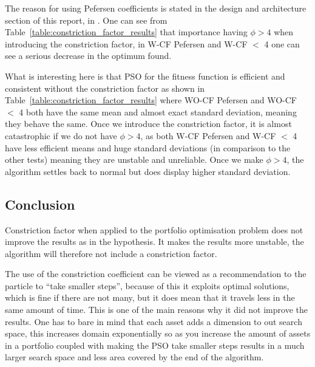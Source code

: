       The reason for using Pefersen coefficients is stated in the design and architecture section of this report,  in . One can see from Table~\ref{table:constriction_factor_results} that importance having $\phi > 4$ when introducing the constriction factor, in W-CF Pefersen and W-CF $<$ 4 one can see a serious decrease in the optimum found. 

      What is interesting here is that PSO for the fitness function is efficient and consistent without the constriction factor as shown in Table~\ref{table:constriction_factor_results} where WO-CF Pefersen and WO-CF $<$ 4 both have the same mean and almost exact standard deviation, meaning they behave the same. Once we introduce the constriction factor, it is almost catastrophic if we do not have $\phi > 4$, as both W-CF Pefersen and W-CF $<$ 4 have less efficient means and huge standard deviations (in comparison to the other tests) meaning they are unstable and unreliable. Once we make $\phi > 4$, the algorithm settles back to normal but does display higher standard deviation. 
    \subsection{Conclusion} %
    \label{sub:conclusion}
      Constriction factor when applied to the portfolio optimisation problem does not improve the results as in the hypothesis. It makes the results more unstable, the algorithm will therefore not include a constriction factor. 

      The use of the constriction coefficient can be viewed as a recommendation to the particle to ``take smaller steps''\cite{constriction_factor_4}, because of this it exploits optimal solutions, which is fine if there are not many, but it does mean that it travels less in the same amount of time. This is one of the main reasons why it did not improve the results. One has to bare in mind that each asset adds a dimension to out search space, this increases domain exponentially so as you increase the amount of assets in a portfolio coupled with making the PSO take smaller steps results in a much larger search space and less area covered by the end of the algorithm. 
       


